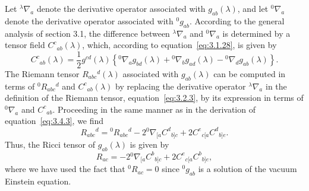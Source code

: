 Let \({}^{\lambda}\nabla_a\) denote the derivative operator associated with
\(g_{ab}(\lambda)\), and let \({}^{0}\nabla_a\) denote the derivative operator
associated with \({}^{0}g_{ab}\). According to the general analysis of section 3.1,
the difference between \({}^{\lambda}\nabla_a\) and \({}^{0}\nabla_a\) is
determined by a tensor field \(C^c{}_{ab}(\lambda)\), which, according to
equation~\eqref{eq:3.1.28}, is given by
\begin{equation}
  C^c{}_{ab}(\lambda)
    =\frac12g^{cd}(\lambda)
      \left\{
        {}^{0}\nabla_ag_{bd}(\lambda)
        +{}^{0}\nabla_bg_{ad}(\lambda)
        -{}^{0}\nabla_dg_{ab}(\lambda)
      \right\} .
  \tag{7.5.7}\label{eq:7.5.7}
\end{equation}
The Riemann tensor \(R_{abc}{}^d(\lambda)\) associated with \(g_{ab}(\lambda)\)
can be computed in terms of \({}^{0}R_{abc}{}^d\) and
\(C^c{}_{ab}(\lambda)\) by replacing the derivative operator
\({}^{\lambda}\nabla_a\) in the definition of the Riemann tensor,
equation~\eqref{eq:3.2.3}, by its expression in terms of \({}^{0}\nabla_a\) and
\(C^c{}_{ab}\). Proceeding in the same manner as in the derivation of
equation~\eqref{eq:3.4.3}, we find
\begin{equation}
  R_{abc}{}^d
    ={}^{0}R_{abc}{}^d
      -2{}^{0}\nabla_{[a}C^d{}_{b]c}
      +2C^e{}_{c[a}C^d{}_{b]e} .
  \tag{7.5.8}\label{eq:7.5.8}
\end{equation}
Thus, the Ricci tensor of \(g_{ab}(\lambda)\) is given by
\begin{equation}
  R_{ac}
    =-2{}^{0}\nabla_{[a}C^b{}_{b]c}
      +2C^e{}_{c[a}C^b{}_{b]e} ,
  \tag{7.5.9}\label{eq:7.5.9}
\end{equation}
where we have used the fact that \({}^{0}R_{ac}=0\) since \({}^{0}g_{ab}\) is a
solution of the vacuum Einstein equation.

